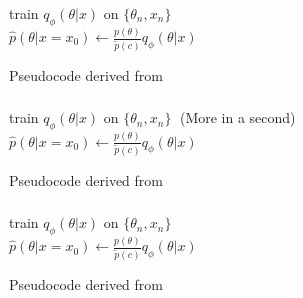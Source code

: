\documentclass[9pt]{beamer}
\begin{document}
\begin{frame}
\frametitle{}
\framesubtitle{}
\begin{algorithm}[H]
	\color{orange}
	\color{black}train $q_{\phi}(\theta| x)$ on $\lbrace \theta_n, x_n \rbrace$\\
	$\hat{p}(\theta|x=x_0) \leftarrow \frac{p(\theta)}{\tilde{p}(c)}q_{\phi}(\theta| x)$
\end{algorithm}
\vspace{35pt}
\tiny Pseudocode derived from \cite{papamakarios2016fast}
\end{frame}
\begin{frame}
\frametitle{}
\framesubtitle{}
\begin{algorithm}[H]
	\color{orange}train $q_{\phi}(\theta| x)$ on $\lbrace \theta_n, x_n \rbrace\;$\color{black} (More in a second)\\
	\color{black}$\hat{p}(\theta|x=x_0) \leftarrow \frac{p(\theta)}{\tilde{p}(c)}q_{\phi}(\theta| x)$
\end{algorithm}
\vspace{35pt}
\tiny Pseudocode derived from \cite{papamakarios2016fast}
\end{frame} 
\begin{frame}
\frametitle{}
\framesubtitle{}
\begin{algorithm}[H]
	train $q_{\phi}(\theta| x)$ on $\lbrace \theta_n, x_n \rbrace$\\
	\color{orange}$\hat{p}(\theta|x=x_0) \leftarrow \frac{p(\theta)}{\tilde{p}(c)}q_{\phi}(\theta| x)$
\end{algorithm}
\vspace{35pt}
\tiny Pseudocode derived from \cite{papamakarios2016fast}
\end{frame} 
\end{document}
